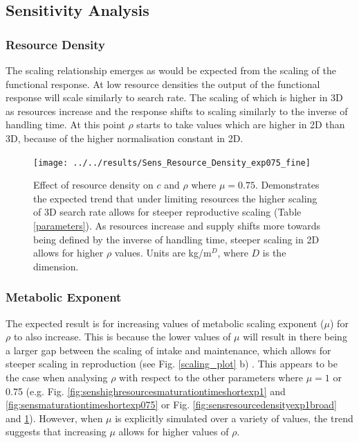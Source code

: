 \documentclass[a4paper, 11pt, hidelinks]{article} %
\begin{document}
	
	\subsection{Sensitivity Analysis}
	\subsubsection{Resource Density}
	The scaling relationship emerges as would be expected from the scaling of the functional response.  At low resource densities the output of the functional response will scale similarly to search rate.  The scaling of which is higher in 3D as resources increase and the response shifts to scaling similarly to the inverse of handling time.  At this point $\rho$ starts to take values which are higher in 2D than 3D, because of the higher normalisation constant in 2D.
	
	\begin{figure}[h]
		\centering
		\texttt{[image: ../../results/Sens\_Resource\_Density\_exp075\_fine]}
		\caption{Effect of resource density on $c$ and $\rho$ where $\mu = 0.75$.  Demonstrates the expected trend that under limiting resources the higher scaling of 3D search rate  allows for steeper reproductive scaling (Table \ref{parameters}).  As resources increase and supply shifts more towards being defined by the inverse of handling time, steeper scaling in 2D allows for higher $\rho$ values.  Units are kg/m$^D$, where $D$ is the dimension.}
		\label{fig:sensresourcedensityexp075fine}
	\end{figure}

	\subsubsection{Metabolic Exponent}
	The expected result is for increasing values of metabolic scaling exponent ($\mu$) for $\rho$ to also increase.  This is because the lower values of $\mu$ will result in there being a larger gap between the scaling of intake and maintenance, which allows for steeper scaling in reproduction (see Fig. \ref{scaling_plot} b) \parencite{Marshall2019}.  This appears to be the case when analysing $\rho$ with respect to the other parameters where $\mu = 1$ or 0.75 (e.g. Fig. \ref{fig:senshighresourcesmaturationtimeshortexp1} and \ref{fig:sensmaturationtimeshortexp075} or Fig. \ref{fig:sensresourcedensityexp1broad} and \ref{fig:sensresourcedensityexp075fine}).  However, when $\mu$ is explicitly simulated over a variety of values, the trend suggests that increasing $\mu$ allows for higher values of $\rho$.  
	
\end{document}
